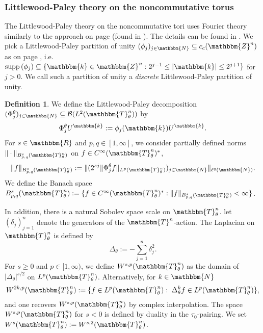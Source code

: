 \documentclass[10pt]{amsart}
\theoremstyle{remark}
\theoremstyle{definition}
\newtheorem{deef}[thm]{Definition}
\begin{document}
\subsubsection{Littlewood-Paley theory on the noncommutative torus}
The Littlewood-Paley theory on the noncommutative tori uses Fourier theory similarly to the approach on page \pageref{lptheoryontorus} (found in \cite{peller}). The details can be found in \cite{xiongxuyin}. We pick a Littlewood-Paley partition of unity $(\phi_j)_{j\in {\mathbbm{N}}}\subseteq c_c({\mathbbm{Z}}^n)$ as on page \pageref{lptheoryontorus}, i.e.~${\mathrm{s} \mathrm{u} \mathrm{p} \mathrm{p}\,}(\phi_j)\subseteq \{\mathbbm{k}\in {\mathbbm{Z}}^n:2^{j-1}\leq |\mathbbm{k}|\leq 2^{j+1}\}$ for $j>0$. We call such a partition of unity a \emph{discrete} Littlewood-Paley partition of unity.

\begin{deef}
We define the Littlewood-Paley decomposition $(\Phi_j^\theta)_{j\in {\mathbbm{N}}}\subseteq {\mathcal{B}}(L^2({\mathbbm{T}}^n_\theta))$ by 
$$\Phi_j^\theta U^{\mathbbm{k}}:=\phi_j(\mathbbm{k})U^{\mathbbm{k}}.$$
For $s\in {\mathbbm{R}}$ and $p,q\in [1,\infty]$, we consider partially defined norms $\|\cdot\|_{B^s_{p,q}({\mathbbm{T}}^n_\theta)}$ on $f\in C^\infty({\mathbbm{T}}^n_\theta)^*$, 
$$\|f\|_{B^s_{p,q}({\mathbbm{T}}^n_\theta)} :=\|(2^{sj}\|\Phi_j^\theta f\|_{L^p({\mathbbm{T}}^n_\theta)})_{j\in {\mathbbm{N}}}\|_{\ell^q({\mathbbm{N}})}.$$
We define the Banach space $B^s_{p,q}({\mathbbm{T}}^n_\theta):=\{f\in C^\infty({\mathbbm{T}}^n_\theta)^*: \|f\|_{B^s_{p,q}({\mathbbm{T}}^n_\theta)} <\infty\}$.
\end{deef}

In addition, there is a natural Sobolev space scale on ${\mathbbm{T}}^n_\theta$. let $(\delta_j)_{j=1}^n$ denote the generators of the ${\mathbbm{T}}^n$-action. The Laplacian on ${\mathbbm{T}}^n_\theta$ is defined by 
$$\Delta_\theta:=-\sum_{j=1}^n \delta_j^2.$$
For $s\geq 0$ and $p\in [1,\infty)$, we define $W^{s,p}({\mathbbm{T}}^n_\theta)$ as the domain of $|\Delta_\theta|^{s/2}$ on $L^p({\mathbbm{T}}^n_\theta)$. Alternatively, for $k\in {\mathbbm{N}}$
$$W^{2k,p}({\mathbbm{T}}^n_\theta):=\{f\in L^p({\mathbbm{T}}^n_\theta): \; \Delta_\theta^{k}f\in L^p({\mathbbm{T}}^n_\theta)\},$$
and one recovers $W^{s,p}({\mathbbm{T}}^n_\theta)$ by complex interpolation. The space $W^{s,p}({\mathbbm{T}}^n_\theta)$ for $s<0$ is defined by duality in the $\tau_0$-pairing. We set $W^{s}({\mathbbm{T}}^n_\theta):=W^{s,2}({\mathbbm{T}}^n_\theta)$.
\end{document}
